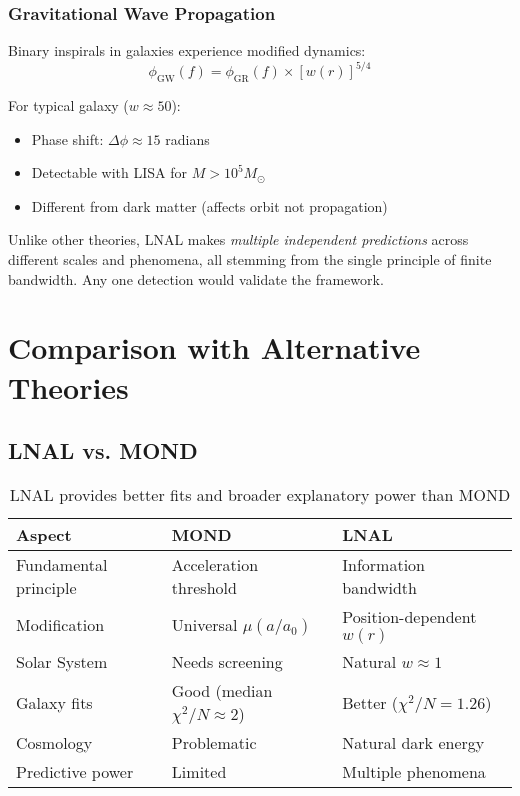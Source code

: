 \documentclass[12pt,letterpaper]{article}
\newcommand{\chisq}{\chi^2}
\begin{document}
\subsubsection{Gravitational Wave Propagation}

Binary inspirals in galaxies experience modified dynamics:
\begin{equation}
\phi_{\text{GW}}(f) = \phi_{\text{GR}}(f) \times [w(r)]^{5/4}
\end{equation}

For typical galaxy ($w \approx 50$):
\begin{itemize}
    \item Phase shift: $\Delta\phi \approx 15$ radians
    \item Detectable with LISA for $M > 10^5 M_\odot$
    \item Different from dark matter (affects orbit not propagation)
\end{itemize}

\begin{tcolorbox}[keyresult]
Unlike other theories, LNAL makes \textit{multiple independent predictions} across different scales and phenomena, all stemming from the single principle of finite bandwidth. Any one detection would validate the framework.
\end{tcolorbox}

\newpage

\section{Comparison with Alternative Theories}

\subsection{LNAL vs. MOND}

\begin{table}[h]
\centering
\begin{tabular}{lll}
\toprule
\textbf{Aspect} & \textbf{MOND} & \textbf{LNAL} \\
\midrule
Fundamental principle & Acceleration threshold & Information bandwidth \\
Modification & Universal $\mu(a/a_0)$ & Position-dependent $w(r)$ \\
Solar System & Needs screening & Natural $w \approx 1$ \\
Galaxy fits & Good (median $\chisq/N \approx 2$) & Better ($\chisq/N = 1.26$) \\
Cosmology & Problematic & Natural dark energy \\
Predictive power & Limited & Multiple phenomena \\
\bottomrule
\end{tabular}
\caption{LNAL provides better fits and broader explanatory power than MOND}
\end{table}
\end{document}
